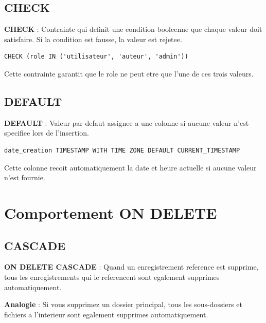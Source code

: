\documentclass[a4paper,12pt]{book}
\begin{document}
\subsection{CHECK}

\begin{definitionbox}
    \textbf{CHECK} : Contrainte qui definit une condition booleenne que chaque valeur doit satisfaire. Si la condition est fausse, la valeur est rejetee.
\end{definitionbox}

\begin{lstlisting}[style=sql]
CHECK (role IN ('utilisateur', 'auteur', 'admin'))
\end{lstlisting}

Cette contrainte garantit que le role ne peut etre que l'une de ces trois valeurs.

\subsection{DEFAULT}

\begin{definitionbox}
    \textbf{DEFAULT} : Valeur par defaut assignee a une colonne si aucune valeur n'est specifiee lors de l'insertion.
\end{definitionbox}

\begin{lstlisting}[style=sql]
date_creation TIMESTAMP WITH TIME ZONE DEFAULT CURRENT_TIMESTAMP
\end{lstlisting}

Cette colonne recoit automatiquement la date et heure actuelle si aucune valeur n'est fournie.

\section{Comportement ON DELETE}

\subsection{CASCADE}

\begin{definitionbox}
    \textbf{ON DELETE CASCADE} : Quand un enregistrement reference est supprime, tous les enregistrements qui le referencent sont egalement supprimes automatiquement.
\end{definitionbox}

\begin{analogybox}
    \textbf{Analogie} : Si vous supprimez un dossier principal, tous les sous-dossiers et fichiers a l'interieur sont egalement supprimes automatiquement.
\end{analogybox}
\end{document}
